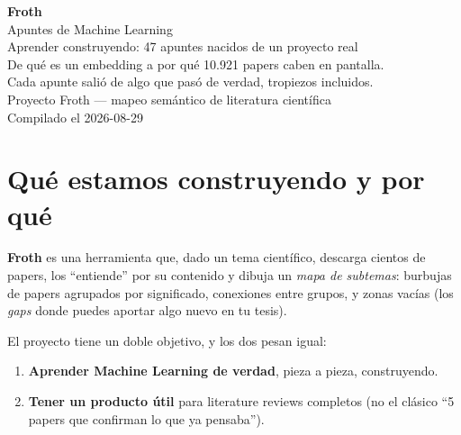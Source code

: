 \documentclass[11pt,a4paper]{article}
\begin{document}
\begin{titlepage}
\centering
\vspace*{3cm}
{\Huge\bfseries\color{litblue} Froth}\\[6pt]
{\Large\color{litblue} Apuntes de Machine Learning}\\[2cm]
{\large Aprender construyendo: 47 apuntes nacidos de un proyecto real}\\[1cm]
{\normalsize De qué es un embedding a por qué 10.921 papers caben en pantalla.\\
Cada apunte salió de algo que pasó de verdad, tropiezos incluidos.}\\[2cm]
{\small\color{litblue} Proyecto Froth --- mapeo semántico de literatura científica}\\[4pt]
{\small Compilado el 2026-08-29}
\vfill
\end{titlepage}
\tableofcontents
\clearpage

{}

\section{Qué estamos construyendo y por qué}

\textbf{Froth} es una herramienta que, dado un tema científico, descarga cientos de
papers, los ``entiende'' por su contenido y dibuja un \emph{mapa de subtemas}: burbujas
de papers agrupados por significado, conexiones entre grupos, y zonas vacías (los
\emph{gaps} donde puedes aportar algo nuevo en tu tesis).

El proyecto tiene un doble objetivo, y los dos pesan igual:
\begin{enumerate}
  \item \textbf{Aprender Machine Learning de verdad}, pieza a pieza, construyendo.
  \item \textbf{Tener un producto útil} para literature reviews completos (no el
        clásico ``5 papers que confirman lo que ya pensaba'').
\end{enumerate}
\end{document}
